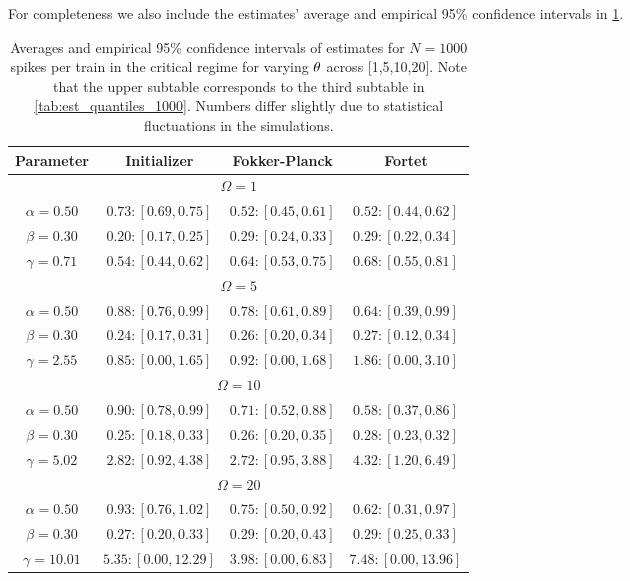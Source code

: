 For completeness we also include the estimates' average and empirical 95\%
confidence intervals in \cref{tab:thetas_est_quantiles_1000}.
\begin{table}[htp]
\begin{center}
{\begin{tabular}{|c|ccc|} 
Parameter
& Initializer
& Fokker-Planck
& Fortet
\\ 
\hline \hline
\multicolumn{4}{|c|}{$\Omega=1$} \\[1mm]
$\alpha=0.50$
& $0.73 : [0.69, 0.75]$
& $0.52 : [0.45, 0.61]$
& $0.52 : [0.44, 0.62]$
\\
$\beta=0.30$
& $0.20 : [0.17, 0.25]$
& $0.29 : [0.24, 0.33]$
& $0.29 : [0.22, 0.34]$
\\
$\gamma=0.71$
& $0.54 : [0.44, 0.62]$
& $0.64 : [0.53, 0.75]$
& $0.68 : [0.55, 0.81]$
\\
\hline \hline
\multicolumn{4}{|c|}{$\Omega=5$} \\[1mm]
$\alpha=0.50$
& $0.88 : [0.76, 0.99]$
& $0.78 : [0.61, 0.89]$
& $0.64 : [0.39, 0.99]$
\\
$\beta=0.30$
& $0.24 : [0.17, 0.31]$
& $0.26 : [0.20, 0.34]$
& $0.27 : [0.12, 0.34]$
\\
$\gamma=2.55$
& $0.85 : [0.00, 1.65]$
& $0.92 : [0.00, 1.68]$
& $1.86 : [0.00, 3.10]$
\\
\hline \hline
\multicolumn{4}{|c|}{$\Omega=10$} \\[1mm]
$\alpha=0.50$
& $0.90 : [0.78, 0.99]$
& $0.71 : [0.52, 0.88]$
& $0.58 : [0.37, 0.86]$
\\
$\beta=0.30$
& $0.25 : [0.18, 0.33]$
& $0.26 : [0.20, 0.35]$
& $0.28 : [0.23, 0.32]$
\\
$\gamma=5.02$
& $2.82 : [0.92, 4.38]$
& $2.72 : [0.95, 3.88]$
& $4.32 : [1.20, 6.49]$
\\
\hline \hline
\multicolumn{4}{|c|}{$\Omega=20$} \\[1mm]
$\alpha=0.50$
& $0.93 : [0.76, 1.02]$
& $0.75 : [0.50, 0.92]$
& $0.62 : [0.31, 0.97]$
\\
$\beta=0.30$
& $0.27 : [0.20, 0.33]$
& $0.29 : [0.20, 0.43]$
& $0.29 : [0.25, 0.33]$
\\
$\gamma=10.01$
& $5.35 : [0.00, 12.29]$
& $3.98 : [0.00, 6.83]$
& $7.48 : [0.00, 13.96]$
\\
\hline
\end{tabular}}\\
\end{center}
\caption[Impact of sinusoidal frequency on estimators]{Averages and empirical
95\% confidence intervals of estimates for $N=1000$ spikes per train in the critical regime for varying ${ \theta}$ across
[1,5,10,20]. Note that the upper subtable corresponds to the third
subtable in \cref{tab:est_quantiles_1000}. Numbers differ slightly due to statistical
fluctuations in the simulations. }
\label{tab:thetas_est_quantiles_1000}
\end{table}



